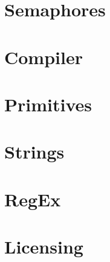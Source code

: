 

\section{Semaphores}\label{ref:app:semaphores}

\section{Compiler}\label{ref:app:compiler}

\section{Primitives}\label{ref:app:primitives}

\section{Strings}\label{ref:app:strings}

\section{RegEx}\label{ref:app:regex}

\section{Licensing}\label{ref:app:licensing}